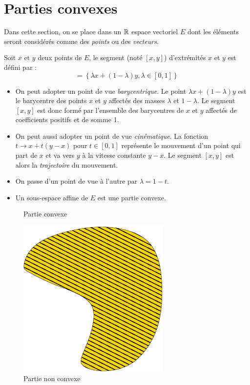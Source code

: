 

\section{Parties convexes}
Dans cette section, on se place dans un $\mathbb{R}$ espace vectoriel $E$ dont les éléments seront considérés comme des \emph{points} ou des \emph{vecteurs}.
\begin{defi}[Segment]
 Soit $x$ et $y$ deux points de $E$, le segment (noté $[x,y]$) d'extrémités $x$ et $y$ est défini par :
\begin{displaymath}
 [x,y] = \left\lbrace \lambda x + (1-\lambda) y , \lambda \in [0,1]\right\rbrace 
\end{displaymath}
\end{defi}
\begin{rems}
 \begin{itemize}
 \item On peut adopter un point  de vue \emph{barycentrique}. Le point $\lambda x + (1-\lambda) y$ est le barycentre des points $x$ et $y$ affectés des masses $\lambda$ et $1-\lambda$. Le segment $[x,y]$ est donc formé par l'ensemble des barycentres de $x$ et $y$ affectés de coefficients positifs et de somme 1.
\item On peut aussi adopter un point de vue \emph{cinématique}. La fonction $t \rightarrow x +t (y-x)$ pour $t\in[0,1]$ représente le mouvement d'un point qui part de $x$ et va vers $y$ à la vitesse constante $y-x$. Le segment $[x,y]$ est alors la \emph{trajectoire} du mouvement.
\item On passe d'un point de vue à l'autre par $\lambda = 1-t$.
\item Un sous-espace affine de $E$ est une partie convexe.
\end{itemize}
\end{rems}
\begin{figure}[h]
  \begin{minipage}{.4\linewidth}
     \centering
      
     \caption{Partie convexe}
  \end{minipage}
  \hfill
  \begin{minipage}{.4\linewidth}
     \includegraphics{C2071_2.pdf}
     \caption{Partie non convexe}
   \end{minipage}
\end{figure}

